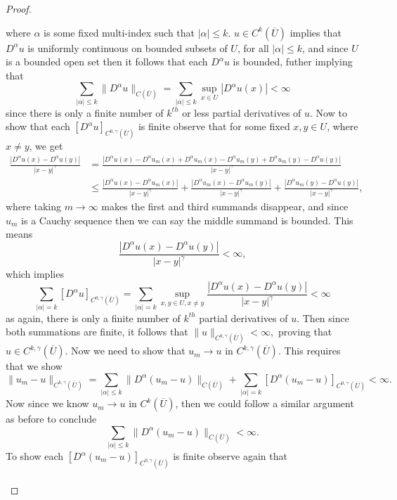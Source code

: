 \documentclass[11pt]{article}
\begin{document}
\begin{proof}
\begin{enumerate}[1.]
			where $\alpha$ is some fixed multi-index such that $|\alpha| \leq k$. 
			$u \in C^k(\overline{U})$ implies that $D^{\alpha}u$ is uniformly continuous on bounded subsets of $U$, for all $|\alpha| \leq k$,
			and since $U$ is a bounded open set then it follows that each $D^{\alpha}u$ is bounded, futher implying that
			\[\sum_{|\alpha| \leq k}\|D^{\alpha}u\|_{C(\overline{U})} = \sum_{|\alpha| \leq k}\sup_{x \in U}{|D^{\alpha}u(x)|} < \infty\]
			since there is only a finite number of $k^{th}$ or less partial derivatives of $u$.
			Now to show that each $[D^{\alpha}u]_{C^{0,\gamma}(\overline{U})}$ is finite observe that for some fixed $x,y \in U$, where $x \not= y$, we get
			\begin{align*}
				\frac{|D^{\alpha}u(x) - D^{\alpha}u(y)|}{|x-y|^{\gamma}} &= \frac{|D^{\alpha}u(x) - D^{\alpha}u_m(x) + D^{\alpha}u_m(x) - D^{\alpha}u_m(y) + D^{\alpha}u_m(y) - D^{\alpha}u(y)|}{|x-y|^{\gamma}} \\
											 &\leq \frac{|D^{\alpha}u(x) - D^{\alpha}u_m(x)|}{|x-y|^{\gamma}} + \frac{|D^{\alpha}u_m(x) - D^{\alpha}u_m(y)|}{|x-y|^{\gamma}} + \frac{|D^{\alpha}u_m(y) - D^{\alpha}u(y)|}{|x-y|^{\gamma}},
			\end{align*}
			where taking $m \rightarrow \infty$ makes the first and third summands disappear, and since $u_m$ is a Cauchy sequence then we can say the middle summand is bounded. This means
			\[\frac{|D^{\alpha}u(x) - D^{\alpha}u(y)|}{|x-y|^{\gamma}} < \infty,\]
			which implies
			\[\sum_{|\alpha| = k}[D^{\alpha}u]_{C^{0,\gamma}(\overline{U})} = \sum_{|\alpha| = k}\sup_{x,y \in U, x \not= y}{\frac{|D^{\alpha}u(x) - D^{\alpha}u(y)|}{|x-y|^{\gamma}}} < \infty\]
			as again, there is only a finite number of $k^{th}$ partial derivatives of $u$. Then since both summations are finite, it follows that
			$\|u\|_{C^{k,\gamma}(\overline{U})} < \infty,$
			proving that $u \in C^{k,\gamma}(\overline{U})$. Now we need to show that $u_m \rightarrow u$ in $C^{k,\gamma}(\overline{U})$. This requires that we show
			\[\|u_m - u\|_{C^{k,\gamma}(\overline{U})} = \sum_{|\alpha| \leq k}\|D^{\alpha}(u_m - u)\|_{C(\overline{U})} + \sum_{|\alpha| = k}[D^{\alpha}(u_m - u)]_{C^{0,\gamma}(\overline{U})} < \infty.\]
			Now since we know $u_m \rightarrow u$ in $C^k(\overline{U})$, then we could follow a similar argument as before to conclude
			\[\sum_{|\alpha| \leq k}\|D^{\alpha}(u_m - u)\|_{C(\overline{U})} < \infty.\]
			To show each $[D^{\alpha}(u_m - u)]_{C^{0,\gamma}(\overline{U})}$ is finite observe again that
			\begin{align*}

\end{align*}
\end{enumerate}
\end{proof}
\end{document}
